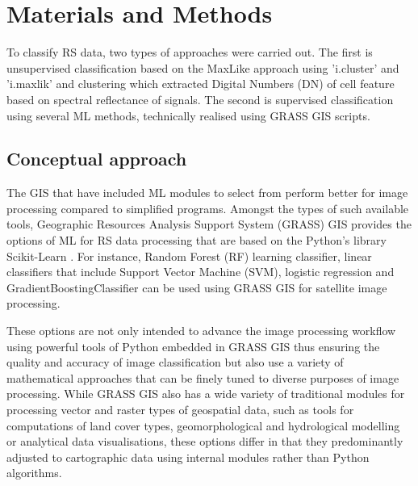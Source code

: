 \documentclass{elektr}
\begin{document}
\section{Materials and Methods}

To classify RS data, two types of approaches were carried out. The first is unsupervised classification based on the MaxLike approach using 'i.cluster' and 'i.maxlik' and clustering which extracted Digital Numbers (DN) of cell feature based on spectral reflectance of signals. The second is supervised classification using several ML methods, technically realised using GRASS GIS scripts.

\subsection{Conceptual approach}
The GIS that have included ML modules to select from perform better for image processing compared to simplified programs. Amongst the types of such available tools, Geographic Resources Analysis Support System (GRASS) GIS provides the options of ML for RS data processing that are based on the Python's library Scikit-Learn \cite{scikitlearn}. For instance, Random Forest (RF) learning classifier, linear classifiers that include Support Vector Machine (SVM), logistic regression and GradientBoostingClassifier can be used using GRASS GIS for satellite image processing. 

These options are not only intended to advance the image processing workflow using powerful tools of Python embedded in GRASS GIS thus ensuring the quality and accuracy of image classification but also use a variety of mathematical approaches that can be finely tuned to diverse purposes of image processing. While GRASS GIS also has a wide variety of traditional modules for processing vector and raster types of geospatial data, such as tools for computations of land cover types, geomorphological and hydrological modelling or analytical data visualisations, these options differ in that they predominantly adjusted to cartographic data using internal modules rather than Python algorithms. 

\end{document}
